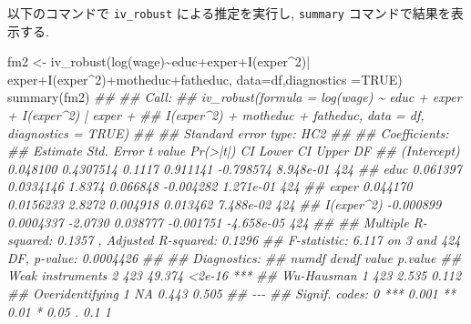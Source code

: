 \documentclass[
  letterpaper,
  xelatex,
  ja=standard, xelatex]{bxjsbook}
\newenvironment{Shaded}{\begin{snugshade}}{\end{snugshade}}
\newcommand{\AttributeTok}[1]{\textcolor[rgb]{0.40,0.45,0.13}{#1}}
\newcommand{\ConstantTok}[1]{\textcolor[rgb]{0.56,0.35,0.01}{#1}}
\newcommand{\DecValTok}[1]{\textcolor[rgb]{0.68,0.00,0.00}{#1}}
\newcommand{\DocumentationTok}[1]{\textcolor[rgb]{0.37,0.37,0.37}{\textit{#1}}}
\newcommand{\FunctionTok}[1]{\textcolor[rgb]{0.28,0.35,0.67}{#1}}
\newcommand{\NormalTok}[1]{\textcolor[rgb]{0.00,0.23,0.31}{#1}}
\newcommand{\OtherTok}[1]{\textcolor[rgb]{0.00,0.23,0.31}{#1}}
\newcommand{\SpecialCharTok}[1]{\textcolor[rgb]{0.37,0.37,0.37}{#1}}
\begin{document}
以下のコマンドで \texttt{iv\_robust} による推定を実行し,
\texttt{summary} コマンドで結果を表示する.

\begin{Shaded}
\begin{Highlighting}[]
\NormalTok{fm2 }\OtherTok{\textless{}{-}} \FunctionTok{iv\_robust}\NormalTok{(}\FunctionTok{log}\NormalTok{(wage)}\SpecialCharTok{\textasciitilde{}}\NormalTok{educ}\SpecialCharTok{+}\NormalTok{exper}\SpecialCharTok{+}\FunctionTok{I}\NormalTok{(exper}\SpecialCharTok{\^{}}\DecValTok{2}\NormalTok{)}\SpecialCharTok{|}
\NormalTok{            exper}\SpecialCharTok{+}\FunctionTok{I}\NormalTok{(exper}\SpecialCharTok{\^{}}\DecValTok{2}\NormalTok{)}\SpecialCharTok{+}\NormalTok{motheduc}\SpecialCharTok{+}\NormalTok{fatheduc,}
            \AttributeTok{data=}\NormalTok{df,}\AttributeTok{diagnostics =}\ConstantTok{TRUE}\NormalTok{)}
\FunctionTok{summary}\NormalTok{(fm2)}
\DocumentationTok{\#\# }
\DocumentationTok{\#\# Call:}
\DocumentationTok{\#\# iv\_robust(formula = log(wage) \textasciitilde{} educ + exper + I(exper\^{}2) | exper + }
\DocumentationTok{\#\#     I(exper\^{}2) + motheduc + fatheduc, data = df, diagnostics = TRUE)}
\DocumentationTok{\#\# }
\DocumentationTok{\#\# Standard error type:  HC2 }
\DocumentationTok{\#\# }
\DocumentationTok{\#\# Coefficients:}
\DocumentationTok{\#\#              Estimate Std. Error t value Pr(\textgreater{}|t|)  CI Lower   CI Upper  DF}
\DocumentationTok{\#\# (Intercept)  0.048100  0.4307514  0.1117 0.911141 {-}0.798574  8.948e{-}01 424}
\DocumentationTok{\#\# educ         0.061397  0.0334146  1.8374 0.066848 {-}0.004282  1.271e{-}01 424}
\DocumentationTok{\#\# exper        0.044170  0.0156233  2.8272 0.004918  0.013462  7.488e{-}02 424}
\DocumentationTok{\#\# I(exper\^{}2)  {-}0.000899  0.0004337 {-}2.0730 0.038777 {-}0.001751 {-}4.658e{-}05 424}
\DocumentationTok{\#\# }
\DocumentationTok{\#\# Multiple R{-}squared:  0.1357 ,    Adjusted R{-}squared:  0.1296 }
\DocumentationTok{\#\# F{-}statistic: 6.117 on 3 and 424 DF,  p{-}value: 0.0004426}
\DocumentationTok{\#\# }
\DocumentationTok{\#\# Diagnostics:}
\DocumentationTok{\#\#                  numdf dendf  value p.value    }
\DocumentationTok{\#\# Weak instruments     2   423 49.374  \textless{}2e{-}16 ***}
\DocumentationTok{\#\# Wu{-}Hausman           1   423  2.535   0.112    }
\DocumentationTok{\#\# Overidentifying      1    NA  0.443   0.505    }
\DocumentationTok{\#\# {-}{-}{-}}
\DocumentationTok{\#\# Signif. codes:  0 \textquotesingle{}***\textquotesingle{} 0.001 \textquotesingle{}**\textquotesingle{} 0.01 \textquotesingle{}*\textquotesingle{} 0.05 \textquotesingle{}.\textquotesingle{} 0.1 \textquotesingle{} \textquotesingle{} 1}
\end{Highlighting}
\end{Shaded}
\end{document}

